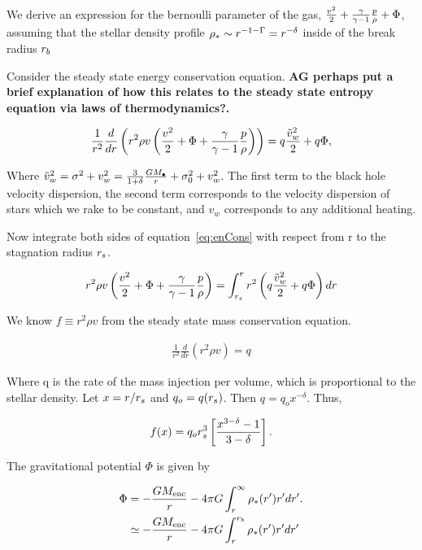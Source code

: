 We derive an expression for the bernoulli parameter of the gas, $\frac{v^2}{2}
+\frac{\gamma}{\gamma-1} \frac{p}{\rho}+\Phi$, assuming that the stellar density
profile $\rho_*\sim r^{-1-\Gamma}=r^{-\delta}$ inside of the break radius $r_b$

Consider the steady state energy conservation equation. {\bf AG perhaps
  put a brief explanation of how this relates to the steady state
  entropy equation via laws of thermodynamics?.}

\begin{align}
\frac{1}{r^2} \frac{d}{dr} \left(r^2 \rho v \left(\frac{v^2}{2} + \Phi
    + \frac{\gamma}{\gamma-1} \frac{p}{\rho}\right) \right) = q \frac{\tilde{v}_{w}^2}{2} + q \Phi,
\label{eq:enCons}
\end{align}

Where $\tilde{v}_{w}^2=\sigma^2+v_w^2= \frac{3}{1+\delta}\frac{G
  M_{\bullet}}{r}+\sigma_0^2+v_w^2$. The first term to the black hole
velocity dispersion, the second term corresponds to the velocity
dispersion of stars which we rake to be constant, and $v_w$
corresponds to any additional heating.

Now integrate both sides of equation~\eqref{eq:enCons} with respect from r to the stagnation radius $r_s$.

\begin{align}
  r^2 \rho v \left(\frac{v^2}{2}+\Phi+\frac{\gamma}{\gamma-1} \frac{p}{\rho} \right)= \int_{r_s}^{r}
    r^2 \left(q \frac{\tilde{v}_{w}^2}{2} + q\Phi\right) dr
    \label{eq:enConsInt}
\end{align}

We know $f\equiv r^2 \rho v$ from the steady state mass conservation
equation. 

\begin{align}
 \frac{1}{r^2} \frac{d}{dr} \left(r^2 \rho v\right) = q 
\end{align}

Where q is the rate of the mass injection per volume, which is
proportional to the stellar density. Let $x=r/r_s$ and $q_o= q
(r_s)$. Then $q=q_o x^{-\delta}$. Thus,

\begin{align}
 f(x)=q_o r_s^3 \left[\frac{x^{3-\delta}-1}{3-\delta}\right].
 \label{eq:massFlux}
\end{align}

The gravitational potential $\Phi$ is given by

\begin{align}
\Phi&= -\frac{G M_{\rm enc}}{r} - 4 \pi G \int_{r}^{\infty} \rho_*(r') r'
dr'.\nonumber\\
&\simeq -\frac{G M_{\rm enc}}{r} -4 \pi G \int_{r}^{r_b} \rho_*(r') r' dr'
\label{eq:Phi}
\end{align}

